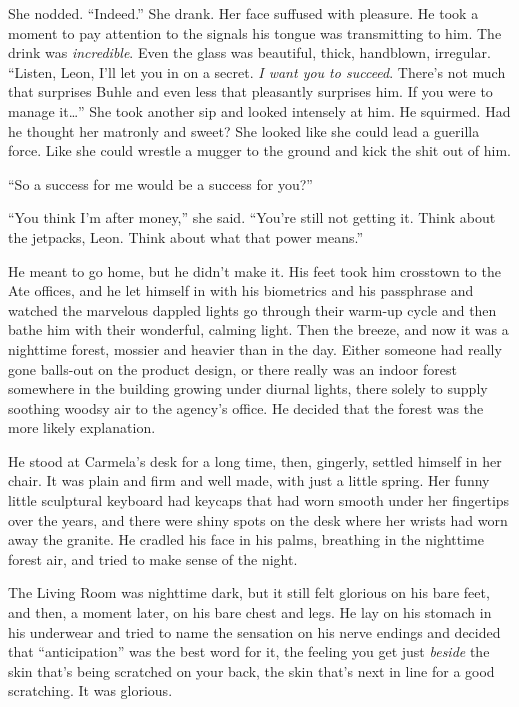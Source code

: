 She nodded. “Indeed.” She drank. Her face suffused with pleasure. 
He took a moment to pay attention to the signals his tongue was 
transmitting to him. The drink was \emph{incredible}. Even the glass 
was beautiful, thick, handblown, irregular. “Listen, Leon, I'll let 
you in on a secret. \emph{I want you to succeed}. There's not much that 
surprises Buhle and even less that pleasantly surprises him. If you 
were to manage it\ldots{}” She took another sip and looked intensely at 
him. He squirmed. Had he thought her matronly and sweet? She looked 
like she could lead a guerilla force. Like she could wrestle a mugger 
to the ground and kick the shit out of him.

“So a success for me would be a success for you?”

“You think I'm after money,” she said. “You're still not getting 
it. Think about the jetpacks, Leon. Think about what that power 
means.”

\tb

He meant to go home, but he didn't make it. His feet took him crosstown 
to the Ate offices, and he let himself in with his biometrics and his 
passphrase and watched the marvelous dappled lights go through their 
warm-up cycle and then bathe him with their wonderful, calming light. 
Then the breeze, and now it was a nighttime forest, mossier and heavier 
than in the day. Either someone had really gone balls-out on the 
product design, or there really was an indoor forest somewhere in the 
building growing under diurnal lights, there solely to supply soothing 
woodsy air to the agency's office. He decided that the forest was the 
more likely explanation.

He stood at Carmela's desk for a long time, then, gingerly, settled 
himself in her chair. It was plain and firm and well made, with just a 
little spring. Her funny little sculptural keyboard had keycaps that 
had worn smooth under her fingertips over the years, and there were 
shiny spots on the desk where her wrists had worn away the granite. He 
cradled his face in his palms, breathing in the nighttime forest air, 
and tried to make sense of the night.

The Living Room was nighttime dark, but it still felt glorious on his 
bare feet, and then, a moment later, on his bare chest and legs. He lay 
on his stomach in his underwear and tried to name the sensation on his 
nerve endings and decided that “anticipation” was the best word for 
it, the feeling you get just \emph{beside} the skin that's being 
scratched on your back, the skin that's next in line for a good 
scratching. It was glorious.

